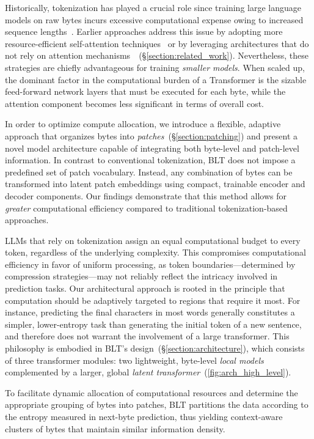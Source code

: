 Historically, tokenization has played a crucial role since training large language models on raw bytes incurs excessive computational expense owing to increased sequence lengths~\citep{xue2022byt5}. Earlier approaches address this issue by adopting more resource-efficient self-attention techniques~\citep{el2020characterbert, clark2022canine} or by leveraging architectures that do not rely on attention mechanisms~\citep{wang2024mambabyte}~(\S\ref{section:related_work}). Nevertheless, these strategies are chiefly advantageous for training \textit{smaller models}. When scaled up, the dominant factor in the computational burden of a Transformer is the sizable feed-forward network layers that must be executed for each byte, while the attention component becomes less significant in terms of overall cost.

In order to optimize compute allocation, we introduce a flexible, adaptive approach that organizes bytes into \textit{patches}~(\S\ref{section:patching}) and present a novel model architecture capable of integrating both byte-level and patch-level information. In contrast to conventional tokenization, {\textsc BLT} does not impose a predefined set of patch vocabulary. Instead, any combination of bytes can be transformed into latent patch embeddings using compact, trainable encoder and decoder components. Our findings demonstrate that this method allows for \textit{greater} computational efficiency compared to traditional tokenization-based approaches.

LLMs that rely on tokenization assign an equal computational budget to every token, regardless of the underlying complexity. This compromises computational efficiency in favor of uniform processing, as token boundaries—determined by compression strategies—may not reliably reflect the intricacy involved in prediction tasks. Our architectural approach is rooted in the principle that computation should be adaptively targeted to regions that require it most. For instance, predicting the final characters in most words generally constitutes a simpler, lower-entropy task than generating the initial token of a new sentence, and therefore does not warrant the involvement of a large transformer. This philosophy is embodied in {\textsc BLT}'s design~(\S\ref{section:architecture}), which consists of three transformer modules: two lightweight, byte-level \textit{local models} complemented by a larger, global \textit{latent transformer}~(\autoref{fig:arch_high_level}). 

To facilitate dynamic allocation of computational resources and determine the appropriate grouping of bytes into patches, {\textsc BLT} partitions the data according to the entropy measured in next-byte prediction, thus yielding context-aware clusters of bytes that maintain similar information density.

